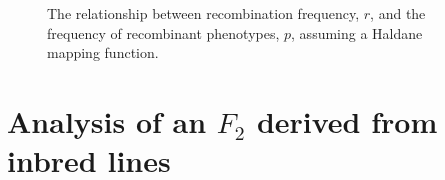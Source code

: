\documentclass[12pt]{article}
\begin{document}
\begin{figure}
\begin{center}
\end{center}
\caption{The relationship between recombination frequency, $r$, and
  the frequency of recombinant phenotypes, $p$, assuming a Haldane
  mapping function.}\label{fig:recombination}
\end{figure}

\section*{Analysis of an $F_2$ derived from inbred lines}
\end{document}
